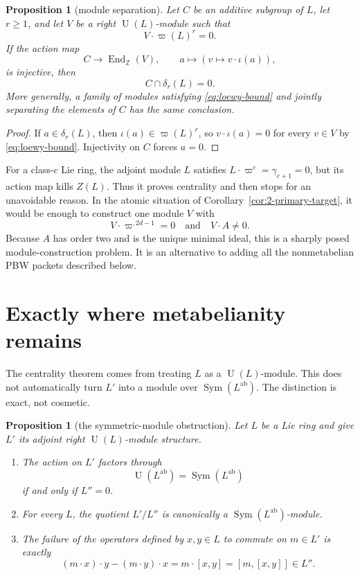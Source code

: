 \documentclass[a4paper,11pt,reqno]{amsart}
\newtheorem{proposition}[theorem]{Proposition}
\theoremstyle{definition}
\theoremstyle{remark}
\newcommand{\Z}{\mathbb Z}
\newcommand{\U}{\operatorname U}
\newcommand{\aug}{\varpi}
\newcommand{\dlt}{\delta}
\newcommand{\gm}{\gamma}
\newcommand{\Sym}{\operatorname{Sym}}
\newcommand{\ab}{\mathrm{ab}}
\begin{document}
\begin{proposition}[module separation]\label{prop:module-separation}
Let $C$ be an additive subgroup of $L$, let $r\geq1$, and let
$V$ be a right $\U(L)$-module such that
\begin{equation}\label{eq:loewy-bound}
                          V\cdot\aug(L)^r=0.
\end{equation}
If the action map
\[
 C\longrightarrow\operatorname{End}_{\Z}(V),
 \qquad a\longmapsto(v\mapsto v\cdot\iota(a)),
\]
is injective, then
\begin{equation}\label{eq:module-separation}
                           C\cap\dlt_r(L)=0.
\end{equation}
More generally, a family of modules satisfying \eqref{eq:loewy-bound} and
jointly separating the elements of $C$ has the same conclusion.
\end{proposition}

\begin{proof}
If $a\in\dlt_r(L)$, then $\iota(a)\in\aug(L)^r$, so
$v\cdot\iota(a)=0$ for every $v\in V$ by \eqref{eq:loewy-bound}.  Injectivity
on $C$ forces $a=0$.
\end{proof}

For a class-$c$ Lie ring, the adjoint module $L$ satisfies
$L\cdot\aug^c=\gm_{c+1}=0$, but its action map kills $Z(L)$.  Thus it proves
centrality and then stops for an unavoidable reason.  In the atomic situation
of Corollary~\ref{cor:2-primary-target}, it would be enough to construct one
module $V$ with
\[
 V\cdot\aug^{,2d-1}=0
 \quad\text{and}\quad
 V\cdot A\ne0.
\]
Because $A$ has order two and is the unique minimal ideal, this is a sharply
posed module-construction problem.  It is an alternative to adding all the
nonmetabelian PBW packets described below.

\section{Exactly where metabelianity remains}

The centrality theorem comes from treating $L$ as a $\U(L)$-module.  This does
not automatically turn $L'$ into a module over
$\Sym(L^{\ab})$.  The distinction is exact, not cosmetic.

\begin{proposition}[the symmetric-module obstruction]\label{prop:sym-iff}
Let $L$ be a Lie ring and give $L'$ its adjoint right $\U(L)$-module
structure.
\begin{enumerate}[label=\textup{(\roman*)}]
\item The action on $L'$ factors through
\[
             \U(L^{\ab})=\Sym(L^{\ab})
\]
if and only if $L''=0$.
\item For every $L$, the quotient $L'/L''$ is canonically a
$\Sym(L^{\ab})$-module.
\item The failure of the operators defined by $x,y\in L$ to commute on
$m\in L'$ is exactly
\begin{equation}\label{eq:curvature}
 (m\cdot x)\cdot y-(m\cdot y)\cdot x
                     =m\cdot[x,y]=[m,[x,y]]\in L''.
\end{equation}
\end{enumerate}
\end{proposition}
\end{document}

